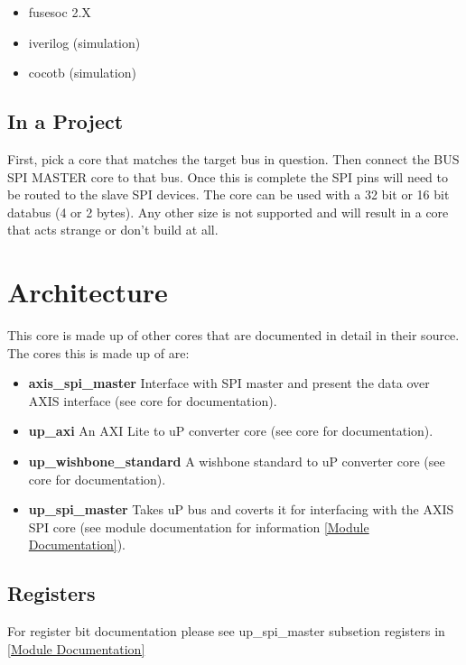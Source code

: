 \begin{itemize}
  \item fusesoc 2.X
  \item iverilog (simulation)
  \item cocotb (simulation)
\end{itemize}







\subsection{In a Project}
\par
First, pick a core that matches the target bus in question. Then connect the BUS SPI MASTER core to that bus. Once this is complete the SPI pins will need to be routed to the slave SPI devices. The core can be used with a 32 bit or 16 bit databus (4 or 2 bytes). Any other size is not supported and will result in a core that acts strange or don't build at all.

\section{Architecture}
\par
This core is made up of other cores that are documented in detail in their source. The cores this is made up of are:
\begin{itemize}
  \item \textbf{axis\_spi\_master} Interface with SPI master and present the data over AXIS interface (see core for documentation).
  \item \textbf{up\_axi} An AXI Lite to uP converter core (see core for documentation).
  \item \textbf{up\_wishbone\_standard} A wishbone standard to uP converter core (see core for documentation).
  \item \textbf{up\_spi\_master} Takes uP bus and coverts it for interfacing with the AXIS SPI core (see module documentation for information \ref{Module Documentation}).
\end{itemize}

\subsection{Registers}
For register bit documentation please see up\_spi\_master subsetion registers in \ref{Module Documentation}

